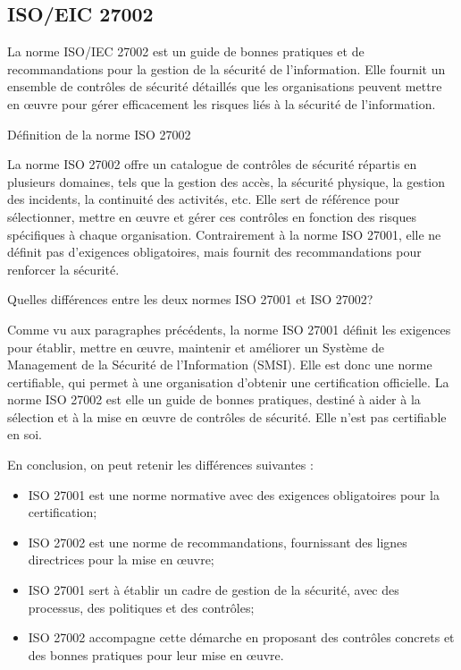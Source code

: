 \subsection{ISO/EIC 27002}


La norme ISO/IEC 27002 est un guide de bonnes pratiques et de recommandations pour la gestion de la sécurité de l'information. Elle fournit un ensemble de contrôles de sécurité détaillés que les organisations peuvent mettre en œuvre pour gérer efficacement les risques liés à la sécurité de l'information.

Définition de la norme ISO 27002


La norme ISO 27002 offre un catalogue de contrôles de sécurité répartis en plusieurs domaines, tels que la gestion des accès, la sécurité physique, la gestion des incidents, la continuité des activités, etc. Elle sert de référence pour sélectionner, mettre en œuvre et gérer ces contrôles en fonction des risques spécifiques à chaque organisation. Contrairement à la norme ISO 27001, elle ne définit pas d'exigences obligatoires, mais fournit des recommandations pour renforcer la sécurité.

Quelles différences entre les deux normes ISO 27001 et ISO 27002?

Comme vu aux paragraphes précédents, la norme ISO 27001 définit les exigences pour établir, mettre en œuvre, maintenir et améliorer un Système de Management de la Sécurité de l'Information (SMSI). Elle est donc une norme certifiable, qui permet à une organisation d'obtenir une certification officielle.
La norme ISO 27002 est elle un guide de bonnes pratiques, destiné à aider à la sélection et à la mise en œuvre de contrôles de sécurité. Elle n’est pas certifiable en soi.

En conclusion, on peut retenir les différences suivantes : 

\begin{itemize}
   \item ISO 27001 est une norme normative avec des exigences obligatoires pour la certification;
   \item ISO 27002 est une norme de recommandations, fournissant des lignes directrices pour la mise en œuvre;
   \item ISO 27001 sert à établir un cadre de gestion de la sécurité, avec des processus, des politiques et des contrôles;
   \item ISO 27002 accompagne cette démarche en proposant des contrôles concrets et des bonnes pratiques pour leur mise en œuvre.
\end{itemize}

